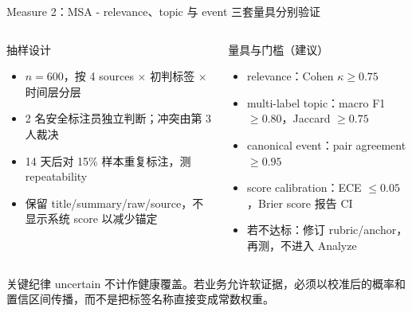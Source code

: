 \begin{frame}{Measure 2：MSA - relevance、topic 与 event 三套量具分别验证}
\scriptsize
\begin{columns}[T,onlytextwidth]
\begin{block}{抽样设计}
\begin{itemize}
  \item $n=600$，按 4 sources × 初判标签 × 时间层分层
  \item 2 名安全标注员独立判断；冲突由第 3 人裁决
  \item 14 天后对 15\% 样本重复标注，测 repeatability
  \item 保留 title/summary/raw/source，不显示系统 score 以减少锚定
\end{itemize}
\end{block}
\begin{block}{量具与门槛（建议）}
\begin{itemize}
  \item relevance：Cohen $\kappa\ge0.75$
  \item multi-label topic：macro F1 $\ge0.80$，Jaccard $\ge0.75$
  \item canonical event：pair agreement $\ge0.95$
  \item score calibration：ECE $\le0.05$，Brier score 报告 CI
  \item 若不达标：修订 rubric/anchor，再测，不进入 Analyze
\end{itemize}
\end{block}
\end{columns}

\begin{alertblock}{关键纪律}
uncertain 不计作健康覆盖。若业务允许软证据，必须以校准后的概率和置信区间传播，而不是把标签名称直接变成常数权重。
\end{alertblock}
\end{frame}

